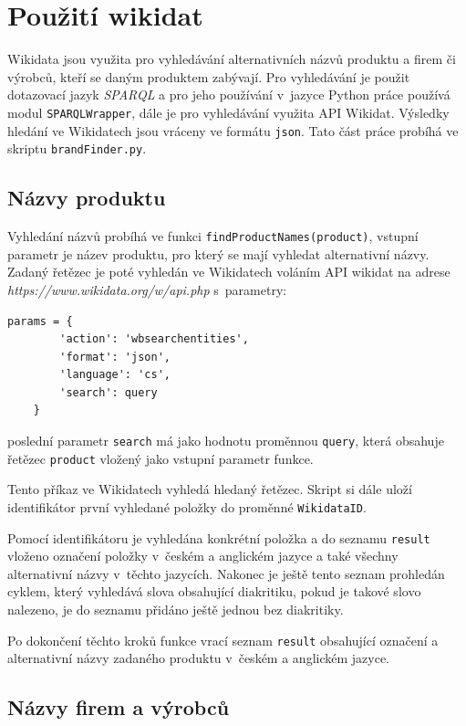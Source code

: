 \section{Použití wikidat}
Wikidata jsou využita pro vyhledávání alternativních názvů produktu a firem či výrobců, kteří se daným produktem zabývají. Pro vyhledávání je použit dotazovací jazyk \textit{SPARQL} a pro jeho používání v~jazyce Python práce používá modul \verb|SPARQLWrapper|, dále je pro vyhledávání využita API Wikidat. Výsledky hledání ve Wikidatech jsou vráceny ve formátu \verb|json|. Tato část práce probíhá ve skriptu \verb|brandFinder.py|.

\subsection*{Názvy produktu}
Vyhledání názvů probíhá ve funkci \verb|findProductNames(product)|, vstupní parametr je název produktu, pro který se mají vyhledat alternativní názvy. Zadaný řetězec je poté vyhledán ve Wikidatech voláním API wikidat na adrese \textit{https://www.wikidata.org/w/api.php} s~parametry:

\begin{lstlisting}[language=SPARQL]
    params = {
        'action': 'wbsearchentities',
        'format': 'json',
        'language': 'cs',
        'search': query
    }
\end{lstlisting}

poslední parametr \verb|search| má jako hodnotu proměnnou \verb|query|, která obsahuje řetězec \verb|product| vložený jako vstupní parametr funkce.

Tento příkaz ve Wikidatech vyhledá hledaný řetězec. Skript si dále uloží identifikátor první vyhledané položky do proměnné \verb|WikidataID|. 

Pomocí identifikátoru je vyhledána konkrétní položka a do seznamu \verb|result| vloženo označení položky v~českém a anglickém jazyce a také všechny alternativní názvy v~těchto jazycích. Nakonec je ještě tento seznam prohledán cyklem, který vyhledává slova obsahující diakritiku, pokud je takové slovo nalezeno, je do seznamu přidáno ještě jednou bez diakritiky.

Po dokončení těchto kroků funkce vrací seznam \verb|result| obsahující označení a alternativní názvy zadaného produktu v~českém a anglickém jazyce.

\subsection*{Názvy firem a výrobců}

